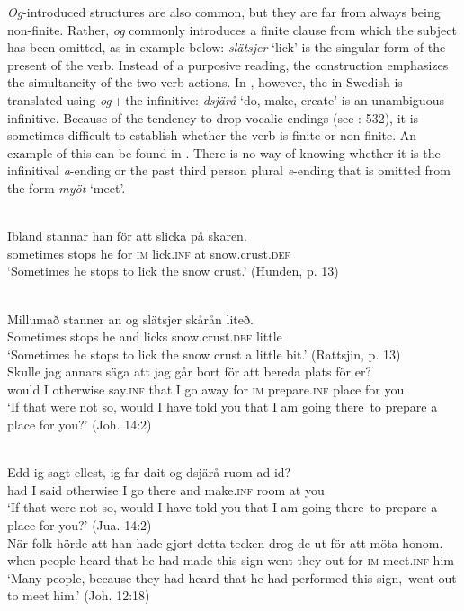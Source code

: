 \documentclass[output=paper]{langscibook}
\begin{document}
\textit{Og}-introduced structures are also common, but they are far from always being non-finite. Rather, \textit{og} commonly introduces a finite clause from which the subject has been omitted, as in example  below: \textit{slätsjer} ‘lick’ is the singular form of the present  of the verb. Instead of a purposive reading, the construction emphasizes the simultaneity of the two verb actions. In , however, the  in Swedish is translated using \textit{og}\,+\,the infinitive: \textit{dsjärå} ‘do, make, create’ is an unambiguous infinitive. Because of the  tendency to drop vocalic endings (see \citealt{AkerbergNystrom2012}: 532), it is sometimes difficult to establish whether the verb is finite or non-finite. An example of this can be found in . There is no way of knowing whether it is the infinitival \textit{a}{}-ending or the past  third person plural \textit{e}{}-ending that is omitted from the form \textit{myöt} ‘meet’. 


\ea
\label{ex:kalm:17}
\ea {}\label{ex:kalm:17a}\\
\gll Ibland stannar han för att slicka på skaren.\\
sometimes stops he for \textsc{im} lick.\textsc{inf} at snow.crust.\textsc{def}\\
\glt ‘Sometimes he stops to lick the snow crust.’ (Hunden, p. 13)

\ex {}\label{ex:kalm:17b}\\ 
\gll Millumað stanner an og slätsjer skårån liteð.\\
Sometimes stops he and licks snow.crust.\textsc{def} little\\
\glt ‘Sometimes he stops to lick the snow crust a little bit.’ (Rattsjin, p. 13)
\z 
\ex
\label{ex:kalm:18}
\ea {}\label{ex:kalm:18a}\\
\gll Skulle jag annars säga att jag går bort för att bereda plats för er?\\
would I otherwise say.\textsc{inf} that I go away for \textsc{im} prepare.\textsc{inf} place for you\\
\glt ‘If that were not so, would I have told you that I am going there{~}to prepare a place for you?’ (Joh. 14:2)

\ex {}\label{ex:kalm:18b}\\
\gll Edd ig sagt ellest, ig far dait og dsjärå ruom ad id?\\
had I said otherwise I go there and make.\textsc{inf} room at you\\
 \glt ‘If that were not so, would I have told you that I am going there{~}to prepare a place for you?’ (Jua. 14:2)
\z 
\ex
\label{ex:kalm:19}
\ea {}\label{ex:kalm:19a}\\
\gll När folk hörde att han hade gjort detta tecken drog de ut för att möta honom.\\
when people heard that he had made this sign went they out for \textsc{im} meet.\textsc{inf} him\\
\glt ‘Many people, because they had heard that he had performed this sign,{~}went out to meet him.’ (Joh. 12:18)
\end{document}
